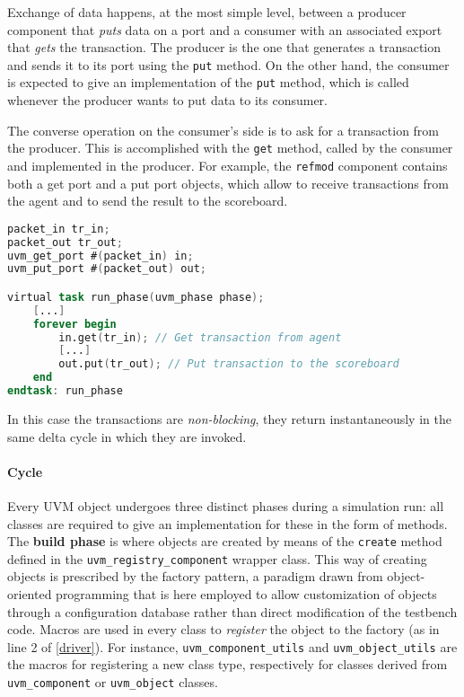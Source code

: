 Exchange of data happens, at the most simple level, between a producer component that \textit{puts} data on a port and a consumer with an associated export that \textit{gets} the transaction. The producer is the one that generates a transaction and sends it to its port using the \texttt{put} method. On the other hand, the consumer is expected to give an implementation of the \texttt{put} method, which is called whenever the producer wants to put data to its consumer. 

The converse operation on the consumer's side is to ask for a transaction from the producer. This is accomplished with the \texttt{get} method, called by the consumer and implemented in the producer.
For example, the \texttt{refmod} component contains both a get port and a put port objects, which allow to receive transactions from the agent and to send the result to the scoreboard.

\begin{lstlisting}[language = verilog, caption = Snippet from \textit{refmod.sv}]
packet_in tr_in;
packet_out tr_out;
uvm_get_port #(packet_in) in;
uvm_put_port #(packet_out) out;

virtual task run_phase(uvm_phase phase);
	[...]
	forever begin
		in.get(tr_in); // Get transaction from agent
		[...]
		out.put(tr_out); // Put transaction to the scoreboard
	end
endtask: run_phase
\end{lstlisting}

In this case the transactions are \textit{non-blocking}, they return instantaneously in the same delta cycle in which they are invoked.

\paragraph{Cycle} Every UVM object undergoes three distinct phases during a simulation run: all classes are required to give an implementation for these in the form of methods.
The \textbf{build phase} is where objects are created by means of the \texttt{create} method defined in the \texttt{uvm\_registry\_component} wrapper class. This way of creating objects is prescribed by the factory pattern, a paradigm drawn from object-oriented programming that is here employed to allow customization of objects through a configuration database rather than direct modification of the testbench code. Macros are used in every class to \textit{register} the object to the factory (as in line 2 of \ref{driver}). For instance, \texttt{uvm\_component\_utils} and \texttt{uvm\_object\_utils} are the macros for registering a new class type, respectively for classes derived from \texttt{uvm\_component} or \texttt{uvm\_object} classes\cite{sistenix}.

